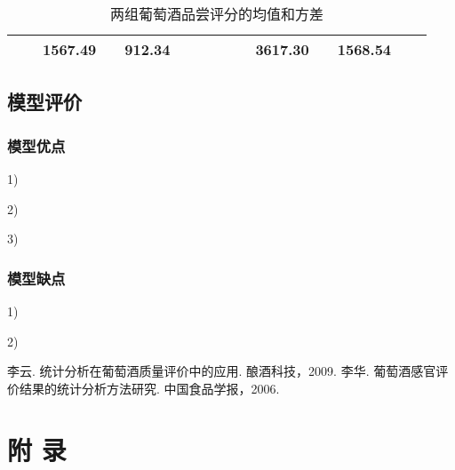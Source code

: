 \documentclass[nocover]{cumcmart}%
\begin{document}
\begin{table}[!htbp]
\begin{tabular}{ccccccccccccccc}
        \midrule
                &          & 1567.49  &  & 912.34  &         &       &        &     &          &   3617.30 &   & 1568.54  &           &         \\
        \bottomrule
        \end{tabular}
        \caption{两组葡萄酒品尝评分的均值和方差}
    \end{table}
 

    \subsection{模型评价}

        \subsubsection{模型优点}
1)	

2)	

3)	

        \subsubsection{模型缺点}
1)	

2)	



\begin{thebibliography}{10}

 李云. 统计分析在葡萄酒质量评价中的应用. 酿酒科技，2009.
 李华. 葡萄酒感官评价结果的统计分析方法研究. 中国食品学报，2006.

\end{thebibliography}


\newpage
\appendix
\section*{附 \quad 录}
\end{document}
